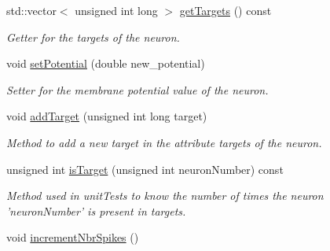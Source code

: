 \begin{DoxyCompactItemize}
std\-::vector$<$ unsigned int long $>$ \hyperlink{classNeuron_a4cf84cd59ed5beb188ea57d5d816a875}{get\-Targets} () const 
\begin{DoxyCompactList}\small\item\em Getter for the targets of the neuron. \end{DoxyCompactList}\item 
void \hyperlink{classNeuron_a1c5dc7a9c8f051767d9d4b07f2107916}{set\-Potential} (double new\-\_\-potential)
\begin{DoxyCompactList}\small\item\em Setter for the membrane potential value of the neuron. \end{DoxyCompactList}\item 
void \hyperlink{classNeuron_acaa75572a99a0fc4cdd3cef8942d4627}{add\-Target} (unsigned int long target)
\begin{DoxyCompactList}\small\item\em Method to add a new target in the attribute targets of the neuron. \end{DoxyCompactList}\item 
unsigned int \hyperlink{classNeuron_a25eb6d9f29ca28b98c02108a675621e0}{is\-Target} (unsigned int neuron\-Number) const 
\begin{DoxyCompactList}\small\item\em Method used in unit\-Tests to know the number of times the neuron 'neuron\-Number' is present in targets. \end{DoxyCompactList}\item 
\hypertarget{classNeuron_a574911e78f0355b016c887dc7c348992}{void \hyperlink{classNeuron_a574911e78f0355b016c887dc7c348992}{increment\-Nbr\-Spikes} ()}\label{classNeuron_a574911e78f0355b016c887dc7c348992}


\end{DoxyCompactItemize}
